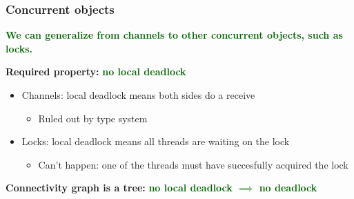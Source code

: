 \documentclass[aspectratio=169]{beamer}
\newcommand{\gemph}[1] {\textcolor{darkgreen}{\textbf{#1}}}
\begin{document}
\begin{frame}[fragile]
  \frametitle{Concurrent objects}

  \gemph{We can generalize from channels to other concurrent objects, such as locks.}
  \bigskip



    \bigskip
    \textbf{Required property:} \gemph{no local deadlock}
    \begin{itemize}
      \item Channels: local deadlock means both sides do a receive
      \begin{itemize}
        \item Ruled out by type system
      \end{itemize}
      \item Locks: local deadlock means all threads are waiting on the lock
      \begin{itemize}
        \item Can't happen: one of the threads must have succesfully acquired the lock
      \end{itemize}
    \end{itemize}
    \textbf{Connectivity graph is a tree:} \gemph{no local deadlock $\implies$ no deadlock}
\end{frame}
\end{document}
